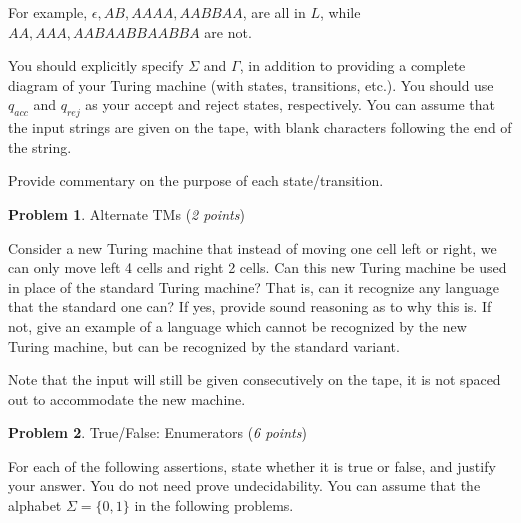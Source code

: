 \documentclass[11pt]{article}
\theoremstyle{definition}
\theoremstyle{theorem}
\newtheorem{prob}{Problem}
\newcommand{\solution}{\medskip\noindent{\color{blue}\textbf{Solution:}}}
\begin{document}
For example, $ \epsilon, AB, AAAA, AABBAA$, are all in $L$, while $AA, AAA, AABAABBAABBA$ are not.

You should explicitly specify $\Sigma$ and $\Gamma$, in addition to providing a complete diagram of your Turing machine (with states, transitions, etc.). You should use $q_{acc}$ and $q_{rej}$ as your accept and reject states, respectively. You can assume that the input strings are given on the tape, with blank characters following the end of the string.

Provide commentary on the purpose of each state/transition.

\solution






\newpage

\begin{prob} Alternate TMs (\emph{2 points})\end{prob}

Consider a new Turing machine that instead of moving one cell left or right, we can only move left 4 cells and right 2 cells. Can this new Turing machine be used in place of the standard Turing machine? That is, can it recognize any language that the standard one can? If yes, provide sound reasoning as to why this is. If not, give an example of a language which cannot be recognized by the new Turing machine, but can be recognized by the standard variant.

Note that the input will still be given consecutively on the tape, it is not spaced out to accommodate the new machine.

\solution




\newpage

\begin{prob} True/False: Enumerators (\emph{6 points})\end{prob}


For each of the following assertions, state whether it is true or false, and justify your answer. You do not need prove undecidability. You can assume that the alphabet $\Sigma = \{0, 1\}$ in the following problems.
\end{document}
